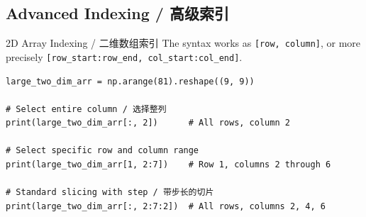 \documentclass[11pt,a4paper]{article}
\begin{document}
\subsection{Advanced Indexing / 高级索引}

\begin{examplebox}{2D Array Indexing / 二维数组索引}
    The syntax works as \texttt{[row, column]}, or more precisely \texttt{[row\_start:row\_end, col\_start:col\_end]}.
\begin{lstlisting}
large_two_dim_arr = np.arange(81).reshape((9, 9))

# Select entire column / 选择整列
print(large_two_dim_arr[:, 2])      # All rows, column 2

# Select specific row and column range
print(large_two_dim_arr[1, 2:7])    # Row 1, columns 2 through 6

# Standard slicing with step / 带步长的切片
print(large_two_dim_arr[:, 2:7:2])  # All rows, columns 2, 4, 6
\end{lstlisting}
\end{examplebox}
\end{document}

